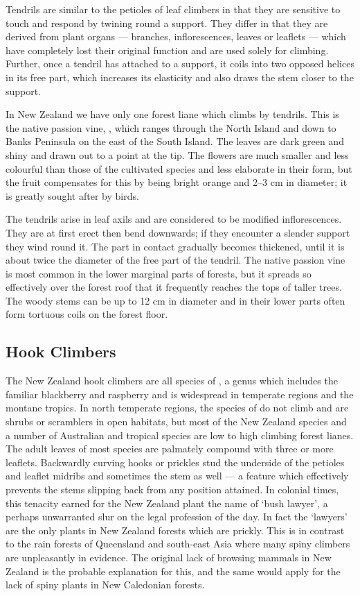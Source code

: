 Tendrils are similar to the petioles of leaf climbers in that they are sensitive to touch and respond by twining round a support.
They differ in that they are derived from plant organs --- branches, inflorescences, leaves or leaflets --- which have completely lost their original function and are used solely for climbing.
Further, once a tendril has attached to a support, it coils into two opposed helices in its free part, which increases its elasticity and also draws the stem closer to the support.

In New Zealand we have only one forest liane which climbs by tendrils.
This is the native passion vine, , which ranges through the North Island and down to Banks Peninsula on the east of the South Island.
The leaves are dark green and shiny and drawn out to a point at the tip.
The flowers are much smaller and less colourful than those of the cultivated species and less elaborate in their form, but the fruit compensates for this by being bright orange and 2--3 cm in diameter; it is greatly sought after by birds.

The tendrils arise in leaf axils and are considered to be modified inflorescences.
They are at first erect then bend downwards; if they encounter a slender support they wind round it.
The part in contact gradually becomes thickened, until it is about twice the diameter of the free part of the tendril.
The native passion vine is most common in the lower marginal parts of forests, but it spreads so effectively over the forest roof that it frequently reaches the tops of taller trees.
The woody stems can be up to 12 cm in diameter and in their lower parts often form tortuous coils on the forest floor.

\subsection{Hook Climbers}

The New Zealand hook climbers are all species of , a genus which includes the familiar blackberry and raspberry and is widespread in temperate regions and the montane tropics.
In north temperate regions, the species of  do not climb and are shrubs or scramblers in open habitats, but most of the New Zealand species and a number of Australian and tropical species are low to high climbing forest lianes.
The adult leaves of most species are palmately compound with three or more leaflets.
Backwardly curving hooks or prickles stud the underside of the petioles and leaflet midribs and sometimes the stem as well --- a feature which effectively prevents the stems slipping back from any position attained.
In colonial times, this tenacity earned for the New Zealand plant the name of `bush lawyer', a perhaps unwarranted slur on the legal profession of the day.
In fact the `lawyers' are the only plants in New Zealand forests which are prickly.
This is in contrast to the rain forests of Queensland and south-east Asia where many spiny climbers are unpleasantly in evidence.
The original lack of browsing mammals in New Zealand is the probable explanation for this, and the same would apply for the lack of spiny plants in New Caledonian forests.

